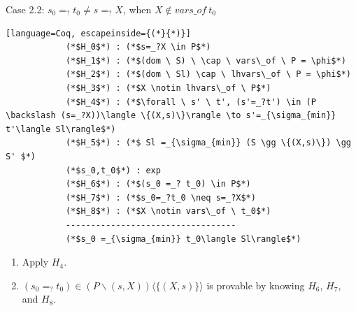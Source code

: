 \documentclass[10pt]{beamer}
\begin{document}
\begin{frame}[fragile]{}
	\begin{block}{Case 2.2: $s_0 =_? t_0 \neq s =_?X$, when $X \notin vars\_of \ t_0$}
		\begin{lstlisting}[language=Coq, escapeinside={(*}{*)}]
			(*$H_0$*) : (*$s=_?X \in P$*)
			(*$H_1$*) : (*$(dom \ S) \ \cap \ vars\_of \ P = \phi$*)
			(*$H_2$*) : (*$(dom \ Sl) \cap \ lhvars\_of \ P = \phi$*)
			(*$H_3$*) : (*$X \notin lhvars\_of \ P$*)
			(*$H_4$*) : (*$\forall \ s' \ t', (s'=_?t') \in (P \backslash (s=_?X))\langle \{(X,s)\}\rangle \to s'=_{\sigma_{min}} t'\langle Sl\rangle$*)
			(*$H_5$*) : (*$ Sl =_{\sigma_{min}} (S \gg \{(X,s)\}) \gg S' $*)
			(*$s_0,t_0$*) : exp
			(*$H_6$*) : (*$(s_0 =_? t_0) \in P$*)
			(*$H_7$*) : (*$s_0=_?t_0 \neq s=_?X$*)
			(*$H_8$*) : (*$X \notin vars\_of \ t_0$*)
			----------------------------------
			(*$s_0 =_{\sigma_{min}} t_0\langle Sl\rangle$*)
		\end{lstlisting}
	\end{block}
\begin{enumerate}
	\item Apply $H_4$.
	\item $(s_0=_?t_0) \in (P \backslash (s,X))\langle \{(X,s)\}\rangle$ is provable by knowing $H_6$, $H_7$, and $H_8$.
\end{enumerate}
\end{frame}
\end{document}
